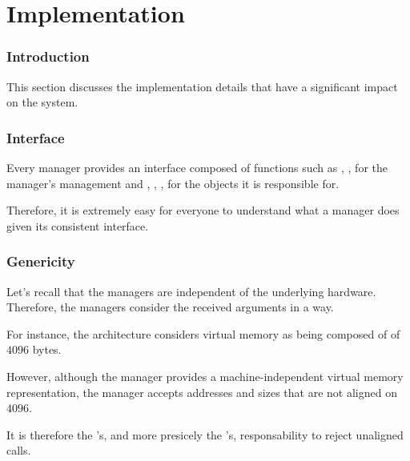 %
%

\section{Implementation}


\begin{frame}
  \frametitle{Introduction}

  This section discusses the implementation details that have a significant
  impact on the system.
\end{frame}


\begin{frame}
  \frametitle{Interface}

  Every manager provides an  interface composed of functions
  such as , ,  for the manager's
  management and , , ,
   \etc{} for the objects it is responsible for.

  \-

  Therefore, it is extremely easy for everyone to understand what a manager
  does given its consistent interface.
\end{frame}


\begin{frame}
  \frametitle{Genericity}

  Let's recall that the  managers are independent of the underlying
  hardware. Therefore, the managers consider the received arguments in a
   way.

  \-

  For instance, the  architecture considers virtual memory as
  being composed of  of $4096$ bytes.

  \-

  However, although the  manager provides a machine-independent
  virtual memory representation, the manager accepts addresses and sizes
  that are not aligned on $4096$.

  \-

  It is therefore the 's, and more presicely the
  's, responsability to reject unaligned calls.
\end{frame}


